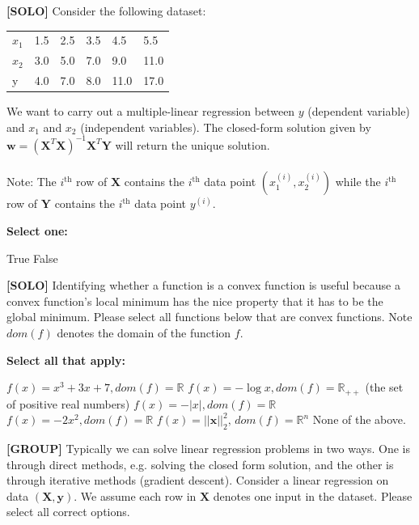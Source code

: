 \documentclass[11pt,addpoints,answers]{exam}
\newcommand{\wv}{\mathbf{w}}
\newcommand{\xv}{\mathbf{x}}
\newcommand{\yv}{\mathbf{y}}
\newcommand{\Xv}{\mathbf{X}}
\newcommand{\Yv}{\mathbf{Y}}
\begin{document}
\begin{questions}
    
    \question[1] \textbf{[SOLO]} Consider the following dataset:
        \begin{table}[H]
    \centering
        \begin{tabular}{llllll}
        $x_1$ & 1.5 & 2.5 & 3.5 & 4.5 & 5.5 \\
        $x_2$ & 3.0 & 5.0 & 7.0 & 9.0 & 11.0 \\
        y & 4.0 & 7.0 & 8.0 & 11.0 & 17.0
        \end{tabular}
    \end{table}
   We want to carry out a multiple-linear regression between $y$ (dependent variable) and $x_1$ and $x_2$ (independent variables). The closed-form solution given by $\wv = \left(\Xv^T\Xv\right)^{-1}\Xv^T \Yv$ will return the unique solution. 
    \\~\\
    Note: The $i^{\text{th}}$ row of $\Xv$ contains the $i^{\text{th}}$ data point $(x_1^{(i)}, x_2^{(i)})$ while the $i^{\text{th}}$ row of $\Yv$ contains the $i^{\text{th}}$ data point $y^{(i)}$. 
    
        \textbf{Select one:}
    \begin{checkboxes}
        \choice True
        \choice False
    \end{checkboxes}
    
    
    \clearpage
    
     \question[3] \textbf{[SOLO]} Identifying whether a function is a convex function is useful because a convex function's local minimum has the nice property that it has to be the global minimum. Please select all functions below that are convex functions. Note $dom(f)$ denotes the domain of the function $f$. \\
        {%
    \checkboxchar{$\Box$} \checkedchar{$\blacksquare$}
    \textbf{Select all that apply:}
    \begin{checkboxes}
        \choice $f(x) = x^3 + 3x + 7, dom(f) = \mathbb{R}$
        \choice $f(x) = -\log x, dom(f) = \mathbb{R}_{++}$ (the set of positive real numbers)
        \choice $f(x) = -|x|, dom(f) = \mathbb{R}$
        \choice $f(x) = -2x^2, dom(f) = \mathbb{R}$
        \choice $f(x) = ||\xv||_2^2,\, dom(f) = \mathbb{R}^n$
        \choice None of the above.
    \end{checkboxes}
    }


    \question[2] \textbf{[GROUP]} Typically we can solve linear regression problems in two ways. One is through direct methods, e.g. solving the closed form solution, and the other is through iterative methods (gradient descent). Consider a linear regression on data $(\Xv, \yv)$. We assume each row in $\Xv$ denotes one input in the dataset. Please select all correct options.
    

\end{questions}
\end{document}
